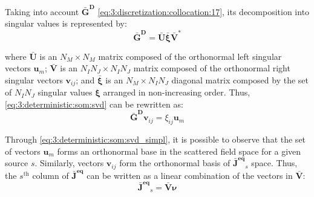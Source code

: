 			Taking into account $\mathbf{\bar{G}^D}$ \eqref{eq:3:discretization:collocation:17}, its decomposition into singular values is represented by:
			\begin{equation}
				\mathbf{\bar{G}^D} = \mathbf{\bar{U}}\boldsymbol{\bar{\xi}}\mathbf{\bar{V}^*} \label{eq:3:deterministic:som:svd}
			\end{equation}
		
			\noindent where $\mathbf{\bar{U}}$ is an $N_M\times N_M$ matrix composed of the orthonormal left singular vectors $\mathbf{u}_m$; $\mathbf{\bar{V}}$ is an $N_IN_J\times N_IN_J$ matrix composed of the orthonormal right singular vectors $\mathbf{v}_{ij}$; and $\boldsymbol{\bar{\xi}}$ is an $N_M\times N_IN_J$ diagonal matrix composed by the set of $N_IN_J$ singular values $\boldsymbol{\xi}$ arranged in non-increasing order. Thus, \eqref{eq:3:deterministic:som:svd} can be rewritten as:
			\begin{equation}
				\mathbf{\bar{G}^D}\mathbf{v}_{ij} = \xi_{ij}\mathbf{u}_m \label{eq:3:deterministic:som:svd_simpl}
			\end{equation}
			
			Through \eqref{eq:3:deterministic:som:svd_simpl}, it is possible to observe that the set of vectors $\mathbf{u}_m$ forms an orthonormal base in the scattered field space for a given source $s$. Similarly, vectors $\mathbf{v}_{ij}$ form the orthonormal basis of $\mathbf{\bar{J}^{eq}}_s$ space. Thus, the $s^{\mathrm{th}}$ column of $\mathbf{\bar{J}^{eq}}$ can be written as a linear combination of the vectors in $\mathbf{\bar{V}}$:
			\begin{equation}
				\mathbf{\bar{J}^{eq}}_s = \mathbf{\bar{V}}\boldsymbol{\nu} \label{eq:3:deterministic:som:nuequation}
			\end{equation}
			
